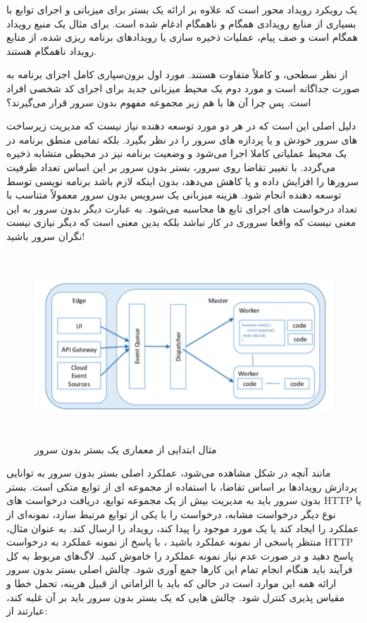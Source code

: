  یک رویکرد رویداد محور است که علاوه بر ارائه یک بستر برای میزبانی و اجرای توابع با بسیاری از منابع رویدادی همگام و ناهمگام ادغام شده است. برای مثال  یک منبع رویداد همگام است و صف پیام، عملیات ذخیره سازی یا رویدادهای برنامه ریزی شده، از منابع رویداد ناهمگام هستند.

از نظر سطحی،  و  کاملاً متفاوت هستند. مورد اول برون‌سپاری کامل اجزای برنامه به صورت جداگانه است و مورد  دوم یک محیط میزبانی جدید برای اجرای کد شخصی افراد است. پس چرا آن ها با هم زیر مجموعه مفهوم بدون سرور قرار می‌گیرند؟

دلیل اصلی این است که در هر دو مورد توسعه دهنده نیاز نیست که مدیریت زیرساخت های سرور خودش و یا پردازه های سرور را در نظر بگیرد. بلکه تمامی منطق برنامه در یک محیط عملیاتی کاملا  اجرا می‌شود و وضعیت برنامه نیز در محیطی متشابه ذخیره می‌گردد. با تغییر تقاضا روی سرور، بستر بدون سرور بر این اساس تعداد ظرفیت سرورها را افزایش داده و یا کاهش می‌دهد، بدون اینکه لازم باشد برنامه نویسی توسط توسعه دهنده انجام شود. هزینه میزبانی یک سرویس بدون سرور معمولاً متناسب با تعداد درخواست های اجرای تابع ها محاسبه می‌شود. به عبارت دیگر بدون سرور به این معنی نیست که واقعا سروری در کار نباشد بلکه بدین معنی است که دیگر نیازی نیست نگران سرور باشید!
\cite{roberts_chapin_2017}

\begin{figure}[!h]
	\centering
	\includegraphics[height=7cm]{images/Serverless-platform-architecture}
	\caption{مثال ابتدایی از معماری یک بستر بدون سرور}
	\label{تصویر 2-1}
\end{figure}

مانند آنچه در شکل مشاهده می‌شود، عملکرد اصلی بستر بدون سرور به توانایی پردازش رویدادها بر اساس تقاضا، با استفاده از مجموعه ای از توابع متکی است. بستر بدون سرور باید به مدیریت بیش از یک مجموعه توابع، دریافت درخواست های HTTP یا نوع دیگر درخواست مشابه، درخواست را با یکی از توابع مرتبط سازد، نمونه‌ای از عملکرد را ایجاد کند یا یک مورد موجود را پیدا کند، رویداد را ارسال کند. به عنوان مثال، منتظر پاسخی از نمونه عملکرد باشید ، با پاسخ از نمونه عملکرد به درخواست HTTP پاسخ دهید و در صورت عدم نیاز نمونه عملکرد را خاموش کنید. لاگ‌های مربوط به کل فرآیند باید هنگام انجام تمام این کارها جمع آوری شود. چالش اصلی بستر بدون سرور ارائه همه این موارد است در حالی که باید با الزاماتی از قبیل هزینه، تحمل خطا و مقیاس پذیری کنترل شود. چالش هایی که یک بستر بدون سرور باید بر آن غلبه کند، عبارتند از:
\cite{pinto_dias_ferreira_2018}
\cite{baldini_2017}

